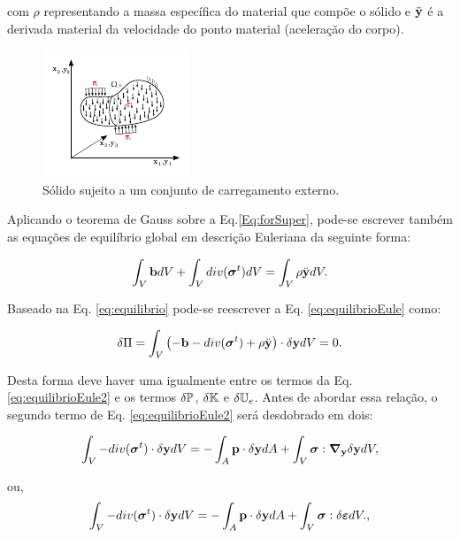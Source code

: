 \documentclass[tese_patricia]{subfiles}
\begin{document}
\noindent com $\rho$ representando a massa específica do material que compõe o sólido e $\ddot{\mathbf{y}}$ é a derivada material da velocidade do ponto material (aceleração do corpo).

\begin{figure}[htb!]
	\centering
	\includegraphics[scale=4,trim=0cm 0.2cm 0cm 0cm, clip=true]{Imagens/Cap3/eqSol3.pdf}	
	\caption{Sólido sujeito a um conjunto de carregamento externo.}
	\label{fig:EquiSol}
\end{figure}
 
 Aplicando o teorema de Gauss sobre a Eq.\eqref{Eq:forSuper}, pode-se escrever também as equações de equilíbrio global em descrição Euleriana da seguinte forma:

\begin{align}
\int_{V} \mathbf{b} dV + \int_{V} div({\boldsymbol{\sigma}}^{t}) dV = \int_{V} \rho  \ddot{\mathbf{y}} dV. \label{eq:equilibrioEule}
\end{align}

Baseado na Eq. \eqref{eq:equilibrio} pode-se reescrever a Eq. \eqref{eq:equilibrioEule} como:

\begin{align}
\delta\Pi = \int_{V} \left(- \mathbf{b} -  div({\boldsymbol{\sigma}}^{t}) + \rho \ddot{\mathbf{y}}\right) \cdot \delta\mathbf{y} dV = 0.\label{eq:equilibrioEule2}
\end{align}

Desta forma deve haver uma igualmente entre os termos da Eq. \eqref{eq:equilibrioEule2} e os termos $\delta\mathbb{P}$, $\delta\mathbb{K}$ e $\delta\mathbb{U}_e$. Antes de abordar essa relação, o segundo termo de Eq. \eqref{eq:equilibrioEule2} será desdobrado em dois:

\begin{align}
\int_{V} - div({\boldsymbol{\sigma}}^{t}) \cdot \delta\mathbf{y} dV = -\int_{A} \mathbf{p} \cdot \delta\mathbf{y} dA +  \int_{V}\boldsymbol{\sigma} : \boldsymbol{\nabla}_{\mathbf{y}} \delta\mathbf{y} dV,\label{eq:DivisaoStress}
\end{align}

\noindent ou,
\begin{align}
\int_{V} - div({\boldsymbol{\sigma}}^{t}) \cdot \delta\mathbf{y} dV = -\int_{A} \mathbf{p} \cdot \delta\mathbf{y} dA +  \int_{V}\boldsymbol{\sigma} : \delta\bm{\varepsilon} dV.\label{eq:DivisaoStress2},
\end{align}
\end{document}
